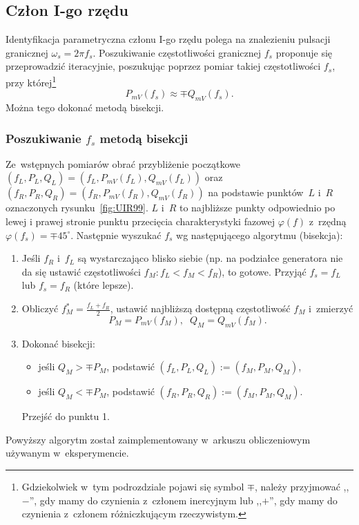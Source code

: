 \documentclass[paper=a4,DIV=12]{lpas}
\newcommand{\degree}{^{\circ}}
\begin{document}
\begin{appendices}
  \subsection{Człon I-go rzędu}
  \label{sec:4C7KI}

  Identyfikacja parametryczna członu I-go rzędu polega na znalezieniu pulsacji
  granicznej $\omega_s = 2 \pi f_s$. Poszukiwanie częstotliwości granicznej
  $f_s$ proponuje się przeprowadzić iteracyjnie, poszukując poprzez pomiar
  takiej częstotliwości $f_s$, przy której\footnote{Gdziekolwiek w~tym
  podrozdziale pojawi się symbol $\mp$, należy przyjmować ,,$-$'', gdy mamy do
  czynienia z~członem inercyjnym lub ,,$+$'', gdy mamy do czynienia z~członem
  różniczkującym rzeczywistym.}
  \begin{equation}
    P_{mV}(f_s) \approx \mp Q_{mV}(f_s).
    \label{eq:7M2JN}
  \end{equation}
  Można tego dokonać metodą bisekcji.

  \subsubsection{Poszukiwanie $f_s$ metodą bisekcji}
  \label{sec:L0JNW}

  Ze~wstępnych pomiarów obrać przybliżenie początkowe
  $(f_L, P_L, Q_L) = (f_L, P_{mV}(f_L), Q_{mV}(f_L))$
  oraz $(f_R, P_R, Q_R) = (f_R, P_{mV}(f_R), Q_{mV}(f_R))$
  na podstawie punktów~$L$ i~$R$ oznaczonych rysunku~\ref{fig:UIR99}. $L$ i~$R$
  to najbliższe punkty odpowiednio po lewej i prawej stronie punktu przecięcia
  charakterystyki fazowej $\varphi(f)$ z~rzędną $\varphi(f_s) = \mp 45\degree$.
  Następnie wyszukać $f_s$ wg następującego algorytmu (bisekcja):

  \begin{enumerate}
    \item Jeśli $f_R$ i~$f_L$ są wystarczająco blisko siebie (np. na podziałce
      generatora nie da się ustawić częstotliwości $f_M: f_L < f_M < f_R$), to
      gotowe. Przyjąć $f_s = f_L$ lub $f_s = f_R$ (które lepsze).
    \item Obliczyć $f_M^{*} = \frac{f_L + f_R}{2}$, ustawić najbliższą dostępną
      częstotliwość $f_M$ i~zmierzyć \[P_M = P_{mV}(f_M),\;\; Q_M = Q_{mV}(f_M).\]
    \item Dokonać bisekcji:
      \begin{itemize}
        \item jeśli $Q_M > \mp P_M$, podstawić $(f_L, P_L, Q_L) := (f_M, P_M, Q_M)$,
        \item jeśli $Q_M < \mp P_M$, podstawić $(f_R, P_R, Q_R) := (f_M, P_M, Q_M)$.
      \end{itemize}
      Przejść do punktu 1.
  \end{enumerate}
  Powyższy algorytm został zaimplementowany w~arkuszu obliczeniowym używanym
  w~eksperymencie.


\end{appendices}
\end{document}

